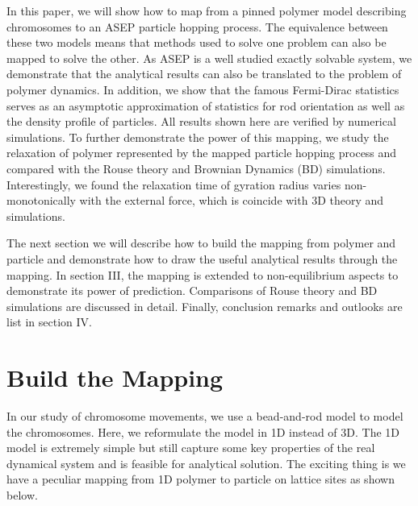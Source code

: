 \documentclass[aps,showpacs,twocolumn,floatfix,prx,superscriptaddress]{revtex4-1}
\begin{document}
In this paper, we will show how to map from a pinned polymer model describing
chromosomes to an ASEP particle hopping process. The equivalence between these
two models means that methods used to solve one problem can also be mapped to
solve the other. As ASEP is a well studied exactly solvable system, we
demonstrate that the analytical results can also be translated to the problem of
polymer dynamics. In addition, we show that the famous Fermi-Dirac statistics
serves as an asymptotic approximation of statistics for rod orientation as well
as the density profile of particles. All results shown here are verified by
numerical simulations. To further demonstrate the power of this mapping, we
study the relaxation of polymer represented by the mapped particle hopping
process and compared with the Rouse theory and Brownian Dynamics (BD)
simulations.  Interestingly, we found the relaxation time of gyration radius
varies non-monotonically with the external force, which is coincide with 3D
theory and simulations.

The next section we will describe how to build the mapping from polymer and
particle and demonstrate how to draw the useful analytical results through the
mapping. In section III, the mapping is extended to non-equilibrium aspects to
demonstrate its power of prediction. Comparisons of Rouse theory and BD
simulations are discussed in detail. Finally, conclusion remarks and outlooks
are list in section IV. 


\section{Build the Mapping}
In our study of chromosome movements, we use a bead-and-rod model to model the
chromosomes. Here, we reformulate the model in 1D instead of 3D. The 1D model
is extremely simple but still capture some key properties of the real dynamical
system and is feasible for analytical solution. The exciting thing is we have a
peculiar mapping from 1D polymer to particle on lattice sites as shown below.  
\end{document}
